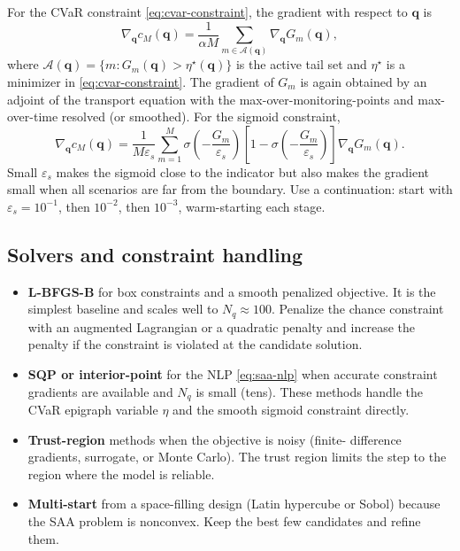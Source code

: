 \documentclass[11pt]{article}
\numberwithin{equation}{section}
\newcommand{\qq}{\mathbf{q}}
\theoremstyle{plain}
\begin{document}
For the CVaR constraint \eqref{eq:cvar-constraint}, the gradient with respect
to $\qq$ is
\begin{equation}
\label{eq:cvar-grad}
\nabla_{\qq} c_M(\qq)
=\frac{1}{\alpha M}\sum_{m\in\mathcal{A}(\qq)}
\nabla_{\qq}G_m(\qq),
\end{equation}
where $\mathcal{A}(\qq)=\{m:G_m(\qq)>\eta^\star(\qq)\}$ is the active tail
set and $\eta^\star$ is a minimizer in \eqref{eq:cvar-constraint}.  The
gradient of $G_m$ is again obtained by an adjoint of the transport equation
with the max-over-monitoring-points and max-over-time resolved (or smoothed).
For the sigmoid constraint,
\begin{equation}
\label{eq:sigmoid-grad}
\nabla_{\qq} c_M(\qq)
=\frac{1}{M\varepsilon_s}\sum_{m=1}^{M}
\sigma\!\left(-\frac{G_m}{\varepsilon_s}\right)
\left[1-\sigma\!\left(-\frac{G_m}{\varepsilon_s}\right)\right]
\nabla_{\qq}G_m(\qq).
\end{equation}
Small $\varepsilon_s$ makes the sigmoid close to the indicator but also makes
the gradient small when all scenarios are far from the boundary.  Use a
continuation: start with $\varepsilon_s=10^{-1}$, then $10^{-2}$, then
$10^{-3}$, warm-starting each stage.

\subsection{Solvers and constraint handling}

\begin{itemize}[leftmargin=1.6em,itemsep=2pt]
  \item \textbf{L-BFGS-B} for box constraints and a smooth penalized objective.
        It is the simplest baseline and scales well to $N_q\approx100$.
        Penalize the chance constraint with an augmented Lagrangian or a
        quadratic penalty and increase the penalty if the constraint is
        violated at the candidate solution.
  \item \textbf{SQP or interior-point} for the NLP \eqref{eq:saa-nlp} when
        accurate constraint gradients are available and $N_q$ is small
        (tens).  These methods handle the CVaR epigraph variable $\eta$ and
        the smooth sigmoid constraint directly.
  \item \textbf{Trust-region} methods when the objective is noisy (finite-
        difference gradients, surrogate, or Monte Carlo).  The trust region
        limits the step to the region where the model is reliable.
  \item \textbf{Multi-start} from a space-filling design (Latin hypercube or
        Sobol) because the SAA problem is nonconvex.  Keep the best few
        candidates and refine them.
\end{itemize}
\end{document}

